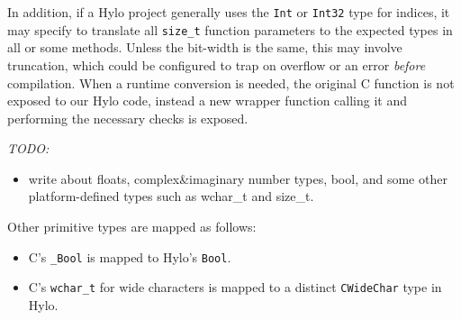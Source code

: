In addition, if a Hylo project generally uses the \texttt{Int} or \texttt{Int32} type for indices, it may specify to translate all \texttt{size\_t} function parameters to the expected types in all or some methods. Unless the bit-width is the same, this may involve truncation, which could be configured to trap on overflow or an error \emph{before} compilation. When a runtime conversion is needed, the original C function is not exposed to our Hylo code, instead a new wrapper function calling it and performing the necessary checks is exposed.

\vspace{1em} %
\textit{TODO:}
\begin{itemize}
    \item write about floats, complex\&imaginary number types, bool, and some other platform-defined types such as wchar\_t and size\_t.
\end{itemize}

Other primitive types are mapped as follows:
\begin{itemize}
    \item C's \texttt{\_Bool} is mapped to Hylo's \texttt{Bool}.
    \item C's \texttt{wchar\_t} for wide characters is mapped to a distinct \texttt{CWideChar} type in Hylo.
\end{itemize}

